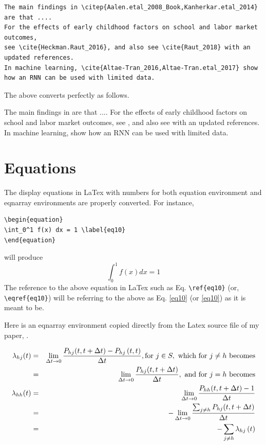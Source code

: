 \documentclass[12pt,svgnames]{article}
\begin{document}
\begin{verbatim}
The main findings in \citep{Aalen.etal_2008_Book,Kanherkar.etal_2014} are that .... 
For the effects of early childhood factors on school and labor market outcomes, 
see \cite{Heckman.Raut_2016}, and also see \cite{Raut_2018} with an updated references. 
In machine learning, \cite{Altae-Tran_2016,Altae-Tran.etal_2017} show 
how an RNN can be used with limited data.
\end{verbatim}

The above converts perfectly as follows.

The main findings in \citep{Aalen.etal_2008_Book,Kanherkar.etal_2014} are that .... For the effects of early childhood factors on school and labor market outcomes, see \cite{Heckman.Raut_2016}, and also see \cite{Raut_2018} with an updated references. In machine learning, \cite{Altae-Tran_2016,Altae-Tran.etal_2017} show how an RNN can be used with limited data. 

\section{Equations}\label{sec4}

The display equations in LaTex with numbers for both equation environment and eqnarray environments are properly converted.  For instance,
\begin{verbatim}
\begin{equation}
\int_0^1 f(x) dx = 1 \label{eq10}
\end{equation}
\end{verbatim}
will produce 
\begin{equation}
\int_0^1 f(x) dx = 1 \label{eq10}
\end{equation}
The reference to the above equation in LaTex such as Eq. \verb&\ref{eq10}& (or, \verb&\eqref{eq10}&) will be referring to the above as Eq. \ref{eq10} (or \eqref{eq10}) as it is meant to be.
 
Here is an eqnarray environment copied directly from the Latex source file of my paper, \cite{Raut_2019}. 

\begin{eqnarray}
\lambda _{hj}(t) &=&\lim_{\Delta t\rightarrow 0}\frac{P_{hj}(t,t+\Delta
t)-P_{hj}\left( t,t\right) }{\Delta t},\text{for }j\in S,\text{ which for }%
j\neq h\text{ becomes}  \notag \\
&=&\lim_{\Delta t\rightarrow 0}\frac{P_{hj}(t,t+\Delta t)}{\Delta t},\text{
and for }j=h\text{ becomes}  \notag \\
\lambda _{hh}(t) &=&\lim_{\Delta t\rightarrow 0}\frac{P_{hh}(t,t+\Delta t)-1%
}{\Delta t}  \label{eq3} \\
&=&-\lim_{\Delta t\rightarrow 0}\frac{\sum_{j\neq h}P_{hj}(t,t+\Delta t)}{%
\Delta t}  \notag \\
&=&-\sum_{j\neq h}\lambda _{hj}\left( t\right)   \notag
\end{eqnarray}%
\end{document}
